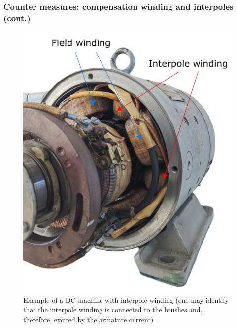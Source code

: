 \begin{frame}
	\frametitle{Counter measures: compensation winding and interpoles (cont.)}
    \begin{figure}
        \centering
        \includegraphics[height=0.70\textheight]{fig/lec03/Interpole_winding_example.png}
        \caption{Example of a DC machine with interpole winding (one may identify that the interpole winding is connected to the brushes and, therefore, excited by the armature current)}
		\label{fig:Interpole_winding_example}
    \end{figure}
\end{frame}

